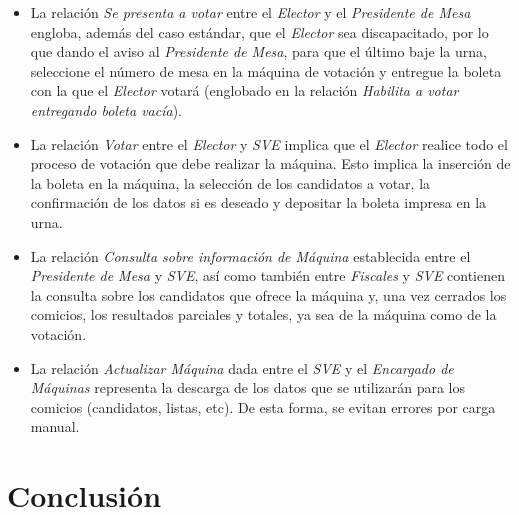 \documentclass[spanish, 10pt,a4paper]{article}
\numberwithin{equation}{section} %
\begin{document}
\begin{itemize}
\item La relación \textit{Se presenta a votar} entre el \textit{Elector} y el \textit{Presidente de Mesa} engloba, además del caso estándar, que el \textit{Elector} sea discapacitado, por lo que dando el aviso al \textit{Presidente de Mesa}, para que el último baje la urna, seleccione el número de mesa en la máquina de votación y entregue la boleta con la que el \textit{Elector} votará (englobado en la relación \textit{Habilita a votar entregando boleta vacía}).
\item La relación \textit{Votar} entre el \textit{Elector} y \textit{SVE} implica que el \textit{Elector} realice todo el proceso de votación que debe realizar la máquina. Esto implica la inserción de la boleta en la máquina, la selección de los candidatos a votar, la confirmación de los datos si es deseado y depositar la boleta impresa en la urna.
\item La relación \textit{Consulta sobre información de Máquina} establecida entre el \textit{Presidente de Mesa} y \textit{SVE}, así como también entre \textit{Fiscales} y \textit{SVE} contienen la consulta sobre los candidatos que ofrece la máquina y, una vez cerrados los comicios, los resultados parciales y totales, ya sea de la máquina como de la votación.
\item La relación \textit{Actualizar Máquina} dada entre el \textit{SVE} y el \textit{Encargado de Máquinas} representa la descarga de los datos que se utilizarán para los comicios (candidatos, listas, etc). De esta forma, se evitan errores por carga manual.
\end{itemize}

\clearpage

\newpage

\section{Conclusión}
	\newpage
\end{document}
